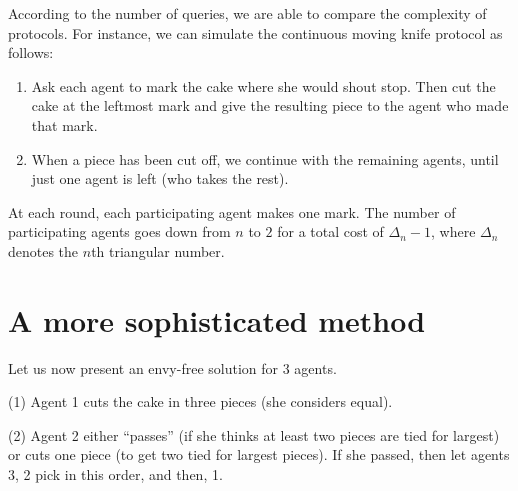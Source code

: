According to the number of queries, we are able to compare the complexity of protocols.
For instance, we can simulate the continuous moving knife protocol as follows:

\begin{enumerate}
\item
Ask each agent to mark the cake where she would shout stop.
Then cut the cake at the leftmost mark and give the resulting piece to the agent who made that mark.
\item
When a piece has been cut off, we continue with the remaining agents, until just one agent is left (who takes the rest).
\end{enumerate}

At each round, each participating agent makes one mark. 
The number of participating agents goes down from $n$ to $2$ for a total cost of $\Delta_n -1$, 
where $\Delta_n$ denotes the $n$th triangular number. 





\section{A more sophisticated method}

Let us now present an envy-free solution for $3$ agents.

(1) Agent 1 cuts the cake in three pieces (she considers equal).

(2) Agent 2 either “passes” (if she thinks at least two pieces are tied for largest) or cuts one piece (to get two tied for largest pieces).
If she passed, then let agents 3, 2 pick in this order, and then, 1.

